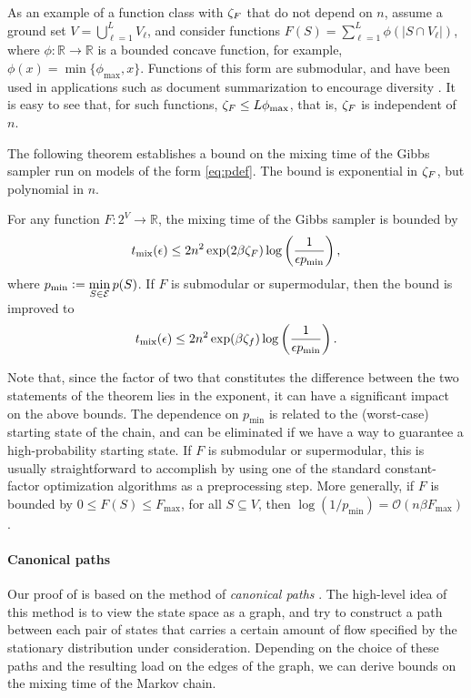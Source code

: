 As an example of a function class with $\zeta_F$ that do not depend on $n$, assume a ground set $V = \bigcup_{\ell = 1}^L V_{\ell}$, and consider functions $F(S) = \sum_{\ell = 1}^L \phi(|S \cap V_{\ell}|)$, where $\phi : \mathbb{R} \to \mathbb{R}$ is a bounded concave function, for example, $\phi(x) = \min\{\phi_{\max}, x\}$.
Functions of this form are submodular, and have been used in applications such as document summarization to encourage diversity \cite{lin11}.
It is easy to see that, for such functions, $\zeta_F \leq L\phi_{\max}$, that is, $\zeta_F$ is independent of $n$.

The following theorem establishes a bound on the mixing time of the Gibbs sampler run on models of the form \eqref{eq:pdef}.
The bound is exponential in $\zeta_F$, but polynomial in $n$.
\begin{theorem} \label{thm:poly}
  For any function $F : 2^V \to \mathbb{R}$, the mixing time of the Gibbs sampler is bounded by
  \begin{align*}
    t_{\mathrm{mix}}(\epsilon) \leq 2n^2 \exp(2 \beta \zeta_F) \log\left(\frac{1}{\epsilon p_{\min}}\right),
  \end{align*}
  where $p_{\min} \vcentcolon= \displaystyle\min_{S \in \mathcal{E}}p(S)$.
  If $F$ is submodular or supermodular, then the bound is improved to
  \begin{align*}
    t_{\mathrm{mix}}(\epsilon) \leq 2n^2 \exp(\beta \zeta_f) \log\left(\frac{1}{\epsilon p_{\min}}\right).
  \end{align*}
\end{theorem}
Note that, since the factor of two that constitutes the difference between the two statements of the theorem lies in the exponent, it can have a significant impact on the above bounds.
The dependence on $p_{\min}$ is related to the (worst-case) starting state of the chain, and can be eliminated if we have a way to guarantee a high-probability starting state.
If $F$ is submodular or supermodular, this is usually straightforward to accomplish by using one of the standard constant-factor optimization algorithms \cite{nemhauser78,fujishige05} as a preprocessing step.
More generally, if $F$ is bounded by $0 \leq F(S) \leq F_{\max}$, for all $S \subseteq V$, then $\log (1/p_{\min}) = \mathcal{O}(n \beta F_{\max})$.

\paragraph{Canonical paths}
Our proof of  is based on the method of \emph{canonical paths} \cite{jerrum03,sinclair92,jerrum89,diaconis91}.
The high-level idea of this method is to view the state space as a graph, and try to construct a path between each pair of states that carries a certain amount of flow specified by the stationary distribution under consideration.
Depending on the choice of these paths and the resulting load on the edges of the graph, we can derive bounds on the mixing time of the Markov chain.

